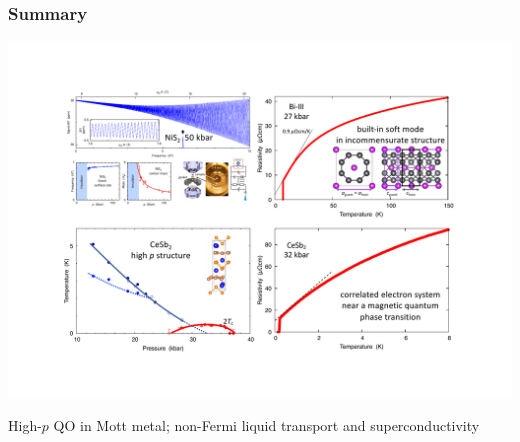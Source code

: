 

\begin{emptyframe}
\frametitle{Summary}
\centerline{\includegraphics[width=\columnwidth]{EndingPicture3.pdf}}
\centerline{\small High-$p$ QO in Mott metal; non-Fermi liquid transport and superconductivity}




\end{emptyframe}
{}

